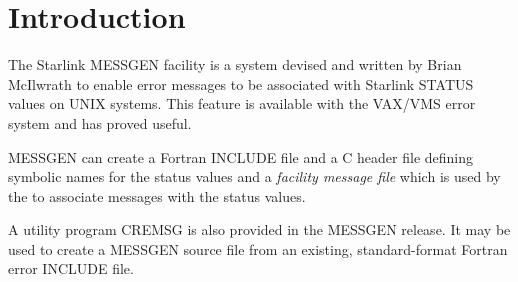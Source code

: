 \documentclass[11pt,nolof]{starlink}
\begin{document}
\scfrontmatter

\section {Introduction}
The Starlink MESSGEN facility is a system devised and written by Brian
McIlwrath to enable error messages to be associated with Starlink STATUS
values on UNIX systems.
This feature is available with the VAX/VMS error system and has proved useful.

MESSGEN can create a Fortran INCLUDE file and a C header file defining
symbolic names for the status values and a \emph{facility message file}
which is used by the
 to associate
messages with the status values.

A utility program CREMSG is also provided in the MESSGEN release. It may be
used to create a MESSGEN source file from an existing, standard-format Fortran
error INCLUDE file.
\end{document}
